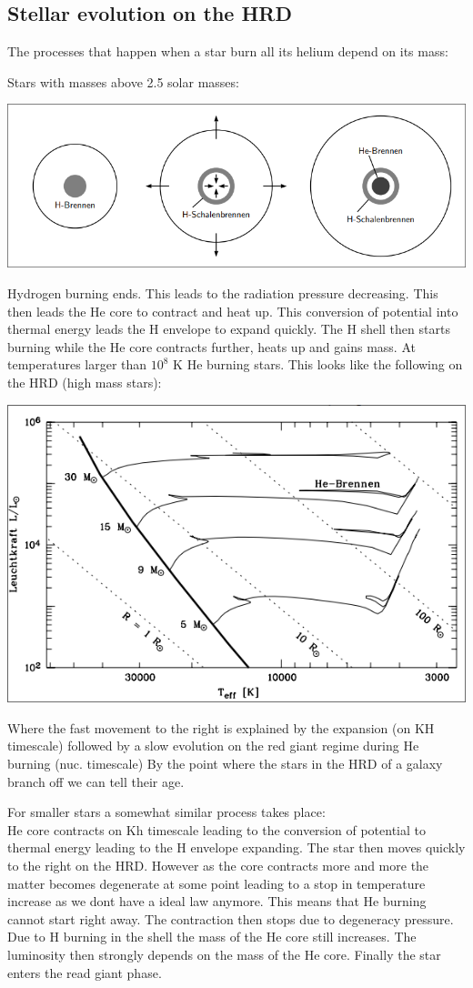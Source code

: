 \documentclass[11pt,a4paper]{article}
\begin{document}
\subsection{Stellar evolution on the HRD}
The processes that happen when a star burn all its helium depend on its mass: 

Stars with masses above 2.5 solar masses: 
\begin{center}
    \includegraphics[width=0.5\linewidth]{screenshot_2024-01-23-123306.png}
\end{center}
Hydrogen burning ends. This leads to the radiation pressure decreasing. 
This then leads the He core to contract and heat up. 
This conversion of potential into thermal energy leads the H envelope to expand quickly. 
The H shell then starts burning while the He core contracts further, heats up and gains mass. 
At temperatures larger than $10^8$ K He burning stars. 
This looks like the following on the HRD (high mass stars): 
\begin{center}
    \includegraphics[width=0.5\linewidth]{screenshot_2024-01-23-123659.png}
\end{center}
Where the fast movement to the right is explained by the expansion (on KH timescale) followed by a slow evolution on the red giant regime during He burning (nuc. timescale)
By the point where the stars in the HRD of a galaxy branch off we can tell their age. 

For smaller stars a somewhat similar process takes place: \\
He core contracts on Kh timescale leading to the conversion of potential to thermal energy leading to the H envelope expanding.
The star then moves quickly to the right on the HRD. 
However as the core contracts more and more the matter becomes degenerate at some point leading to a stop in temperature increase as we dont have a ideal law anymore. 
This means that He burning cannot start right away. 
The contraction then stops due to degeneracy pressure. 
Due to H burning in the shell the mass of the He core still increases. 
The luminosity then strongly depends on the mass of the He core.
Finally the star enters the read giant phase. 
\end{document}
